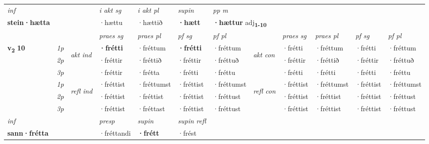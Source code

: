 \begin{longtable}[l]{X>{\footnotesize\itshape}llXXXXlXXXX}
   {\textit{inf}} & &  & \textit{i akt sg} & \textit{i akt pl}    & \textit{supin}  & \textit{pp m} \\*
  {\textbf{stein\allowbreak ·hætta}} & && ·hættu  & ·hættið    &  \textbf{·hætt}  & \multicolumn{2}{l}{\textbf{·hættur} adj\textbf{\textsubscript{1-10}}} \\*

\midrule

 & &   & \textit{praes sg}  & \textit{praes pl}    & \textit{ pf sg} & \textit{pf pl} & & \textit{praes sg}  & \textit{praes pl}    & \textit{pf sg} & \textit{pf pl }  \\ \cmidrule{4-7} \cmidrule{9-12}
 \multirow{2}{*}{{{\textbf{v{\textsubscript{2}}} \Large{\textbf{10}}}}}  & 1p & \multirow{3}{*}{\begin{turn}{90}\textit{akt ind}\end{turn}} & \textbf{·frétti} & ·fréttum & \textbf{·frétti} & ·fréttum & \multirow{3}{*}{\begin{turn}{90}\textit{akt con}\end{turn}} &·frétti & ·fréttum & ·frétti & ·fréttum\\*
 & 2p &  &  ·fréttir  & ·fréttið & ·fréttir & ·fréttuð & & ·fréttir & ·fréttið & ·fréttir & ·fréttuð \\*
 & 3p &  & ·fréttir & ·frétta & ·frétti & ·fréttu & & ·frétti & ·frétti& ·frétti & ·fréttu \\*
\cmidrule{4-7} \cmidrule{9-12}
 & 1p & \multirow{3}{*}{\begin{turn}{90}\textit{refl ind}\end{turn}}  & ·fréttist & ·fréttumst & ·fréttist & ·fréttumst & \multirow{3}{*}{\begin{turn}{90}\textit{refl con}\end{turn}}  &·fréttist & ·fréttumst & ·fréttist & ·fréttumst \\*
 & 2p &  & ·fréttist & ·fréttist & ·fréttist & ·fréttust & &·fréttist & ·fréttist & ·fréttist & ·fréttust \\*
 & 3p  & & ·fréttist & ·fréttast & ·fréttist & ·fréttust & & ·fréttist & ·fréttist& ·fréttist & ·fréttust \\*
\cmidrule{4-7} \cmidrule{9-12}

   {\textit{inf}} & &     & \textit{presp} & \textit{supin} & \textit{supin refl}  \\*
  {\textbf{sann\allowbreak ·frétta}} & &     & ·fréttandi &  \textbf{·frétt} & ·frést  \\*


\end{longtable}
